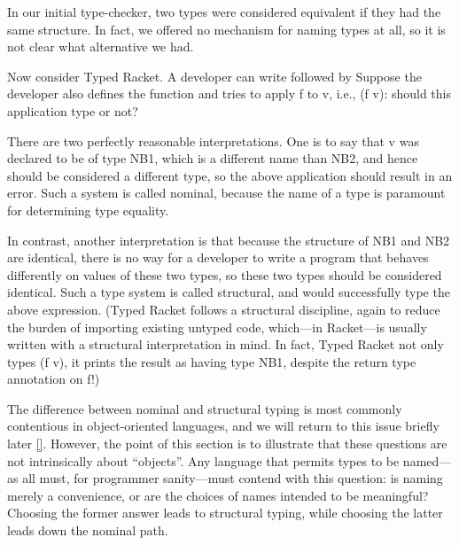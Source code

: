 
In our initial type-checker, two types were considered equivalent if they had
the same structure. In fact, we offered no mechanism for naming types at all, so
it is not clear what alternative we had.

Now consider Typed Racket. A developer can write
followed by
Suppose the developer also defines the function
and tries to apply f to v, i.e., (f v): should this application type or not?

There are two perfectly reasonable interpretations. One is to say that v was
declared to be of type NB1, which is a different name than NB2, and hence should
be considered a different type, so the above application should result in an
error. Such a system is called nominal, because the name of a type is paramount
for determining type equality.

In contrast, another interpretation is that because the structure of NB1 and NB2
are identical, there is no way for a developer to write a program that behaves
differently on values of these two types, so these two types should be
considered identical. Such a type system is called structural, and would
successfully type the above expression. (Typed Racket follows a structural
discipline, again to reduce the burden of importing existing untyped code,
which—in Racket—is usually written with a structural interpretation in mind. In
fact, Typed Racket not only types (f v), it prints the result as having type
NB1, despite the return type annotation on f!)

The difference between nominal and structural typing is most commonly
contentious in object-oriented languages, and we will return to this issue
briefly later \ref{}. However, the point of this section is to illustrate that
these questions are not intrinsically about “objects”. Any language that permits
types to be named—as all must, for programmer sanity—must contend with this
question: is naming merely a convenience, or are the choices of names intended
to be meaningful? Choosing the former answer leads to structural typing, while
choosing the latter leads down the nominal path.
